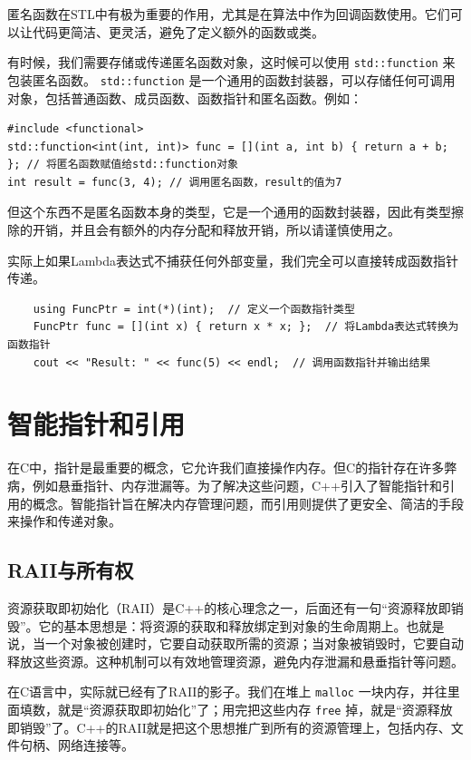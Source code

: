 匿名函数在STL中有极为重要的作用，尤其是在算法中作为回调函数使用。它们可以让代码更简洁、更灵活，避免了定义额外的函数或类。

有时候，我们需要存储或传递匿名函数对象，这时候可以使用 \verb|std::function| 来包装匿名函数。 \verb|std::function| 是一个通用的函数封装器，可以存储任何可调用对象，包括普通函数、成员函数、函数指针和匿名函数。例如：
\begin{verbatim}
#include <functional>
std::function<int(int, int)> func = [](int a, int b) { return a + b; }; // 将匿名函数赋值给std::function对象
int result = func(3, 4); // 调用匿名函数，result的值为7
\end{verbatim}
但这个东西不是匿名函数本身的类型，它是一个通用的函数封装器，因此有类型擦除的开销，并且会有额外的内存分配和释放开销，所以请谨慎使用之。

实际上如果Lambda表达式不捕获任何外部变量，我们完全可以直接转成函数指针传递。
\begin{verbatim}
    using FuncPtr = int(*)(int);  // 定义一个函数指针类型
    FuncPtr func = [](int x) { return x * x; };  // 将Lambda表达式转换为函数指针
    cout << "Result: " << func(5) << endl;  // 调用函数指针并输出结果
\end{verbatim}

\section{智能指针和引用}

在C中，指针是最重要的概念，它允许我们直接操作内存。但C的指针存在许多弊病，例如悬垂指针、内存泄漏等。为了解决这些问题，C++引入了智能指针和引用的概念。智能指针旨在解决内存管理问题，而引用则提供了更安全、简洁的手段来操作和传递对象。

\subsection{RAII与所有权}

资源获取即初始化（RAII）是C++的核心理念之一，后面还有一句“资源释放即销毁”。它的基本思想是：将资源的获取和释放绑定到对象的生命周期上。也就是说，当一个对象被创建时，它要自动获取所需的资源；当对象被销毁时，它要自动释放这些资源。这种机制可以有效地管理资源，避免内存泄漏和悬垂指针等问题。

在C语言中，实际就已经有了RAII的影子。我们在堆上 \verb|malloc| 一块内存，并往里面填数，就是“资源获取即初始化”了；用完把这些内存 \verb|free| 掉，就是“资源释放即销毁”了。C++的RAII就是把这个思想推广到所有的资源管理上，包括内存、文件句柄、网络连接等。

